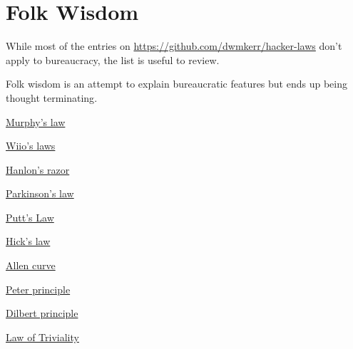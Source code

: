 \section{Folk Wisdom}
While most of the entries on
 \href{https://github.com/dwmkerr/hacker-laws}{https://github.com/dwmkerr/hacker-laws}
don't apply to bureaucracy, the list is useful to review. 

Folk wisdom is an attempt to explain bureaucratic features but ends up being \gls{thought terminating}.

\href{https://en.wikipedia.org/wiki/Murphy\%27s_law}{Murphy's law}

\href{https://en.wikipedia.org/wiki/Wiio\%27s_laws}{Wiio's laws}

\href{https://en.wikipedia.org/wiki/Hanlon\%27s_razor}{Hanlon's razor}

\href{https://en.wikipedia.org/wiki/Parkinson\%27s_law}{Parkinson's law}

\href{https://en.wikipedia.org/wiki/Putt\%27s_Law_and_the_Successful_Technocrat}{Putt's Law}

\href{https://en.wikipedia.org/wiki/Hick\%27s_law}{Hick's law}

\href{https://en.wikipedia.org/wiki/Allen_curve}{Allen curve}

\href{https://en.wikipedia.org/wiki/Peter_principle}{Peter principle}

\href{https://en.wikipedia.org/wiki/Dilbert_principle}{Dilbert principle}

\href{https://en.wikipedia.org/wiki/Law_of_triviality}{Law of Triviality}
